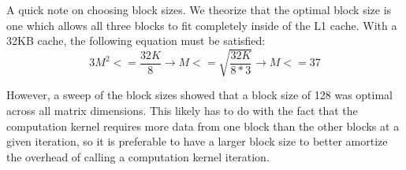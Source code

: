 A quick note on choosing block sizes. We theorize that the optimal block
size is one which allows all three blocks to fit completely inside of the
L1 cache. With a 32KB cache, the following equation must be satisfied:
\[
3M^2 <= \frac{32K}{8} \rightarrow M <= \sqrt{\frac{32K}{8*3}} \rightarrow M <= 37
\]
\smallskip

However, a sweep of the block sizes showed that a block size of 128 was
optimal across all matrix dimensions. This likely has to do with the fact
that the computation kernel requires more data from one block than the
other blocks at a given iteration, so it is preferable to have a larger
block size to better amortize the overhead of calling a computation
kernel iteration.

